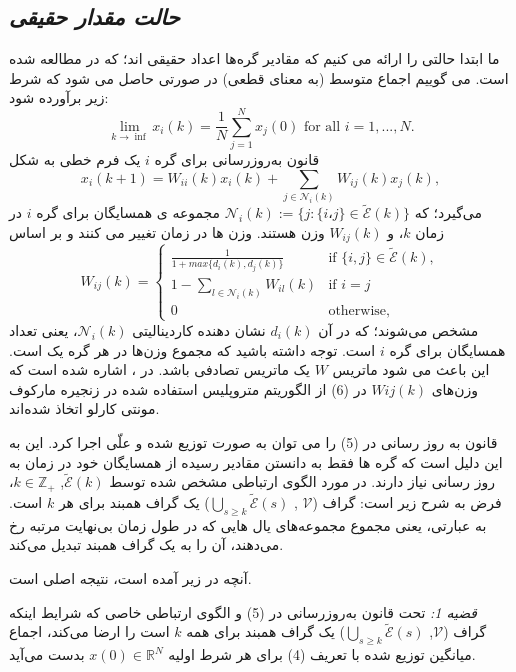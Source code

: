 \documentclass[12pt]{article} %
\begin{document}
	\subsection{\textit{حالت مقدار حقیقی}}
	ما ابتدا حالتی را ارائه می کنیم که مقادیر گره‌ها اعداد حقیقی اند؛ که در \cite{bib28} مطالعه شده است. می گوییم اجماع متوسط (به معنای قطعی) در صورتی حاصل می شود که شرط زیر برآورده شود:
	\begin{equation}
		\lim_{k \rightarrow \inf} x_i(k) = \frac{1}{N} \sum_{j=1}^{N} x_j(0) \text{ for all } i = 1, ..., N.
	\end{equation}
	قانون به‌روزرسانی برای گره $i$ یک فرم خطی به شکل
	\begin{equation}
		x_i(k+1)=W_{ii}(k) x_i(k) + \sum_{j \in \mathscr{N}_i(k)} W_{ij}(k) x_j(k),
	\end{equation}
	می‌گیرد؛ که
	$\mathscr{N}_i(k) := \{j : \{i، j\} \in \tilde{\mathscr{E}}(k)\}$
	مجموعه ی همسایگان برای گره $i$ در زمان $k$، و $W_{ij}(k)$ وزن هستند. وزن ها در زمان تغییر می کنند و بر اساس
	\begin{equation}
		W_{ij}(k)=\begin{cases}
			\frac{1}{1+max\{d_{i}(k),d_{j}(k)\}} & \text{if }\{i,j\}\in \ensuremath{\tilde{\mathscr{E}}(k),}\\
			1-\sum_{l\in\mathscr{N}_{i}(k)}W_{il}(k) & \text{if }i=j\\
			0 & \text{otherwise,}
		\end{cases}
	\end{equation}
	مشخص می‌شوند؛ که در آن $d_i(k)$ نشان دهنده کاردینالیتی $\mathscr{N}_i(k)$، یعنی تعداد همسایگان برای گره $i$ است. توجه داشته باشید که مجموع وزن‌ها در هر گره یک است. این باعث می شود ماتریس $W$ یک ماتریس تصادفی باشد. در \cite{bib28}، اشاره شده است که وزن‌های $Wij(k)$ در (6) از الگوریتم متروپلیس استفاده شده در زنجیره مارکوف مونتی کارلو اتخاذ شده‌اند.
	\par
	قانون به روز رسانی در (5) را می توان به صورت توزیع شده و علّی اجرا کرد. این به این دلیل است که گره ها فقط به دانستن مقادیر رسیده از همسایگان خود در زمان به روز رسانی نیاز دارند. در مورد الگوی ارتباطی مشخص شده توسط $\tilde{\mathscr{E}}(k)$, $k \in \mathbb{Z}_+$، فرض به شرح زیر است: گراف ($\mathscr{V}$ , $\bigcup_{s \geq k} \tilde{\mathscr{E}}(s)$) یک گراف همبند برای هر $k$ است. به عبارتی، یعنی مجموع‌ مجموعه‌های یال هایی که در طول زمان بی‌نهایت مرتبه رخ می‌دهند، آن را به یک گراف همبند تبدیل می‌کند.
	\par
	آنچه در زیر آمده است،‌ نتیجه اصلی \cite{bib28} است.
	\par
	\textit{قضیه 1:}
	تحت قانون به‌روزرسانی در (5) و الگوی ارتباطی خاصی که شرایط اینکه گراف ($\mathscr{V}$, $\bigcup_{s \geq k} \tilde{\mathscr{E}}(s)$) یک گراف همبند برای همه $k$ است را ارضا می‌کند، اجماع میانگین توزیع شده با تعریف (4) برای هر شرط اولیه $x(0) \in \mathbb{R}^N$ بدست می‌آید.
\end{document}
